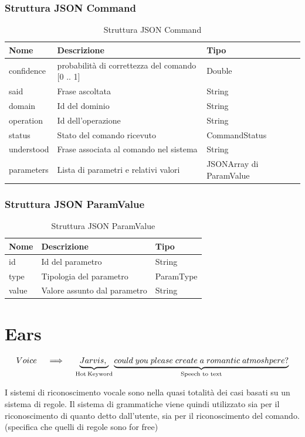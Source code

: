 \documentclass[twoside]{supsistudent}
\begin{document}
\subsection{Struttura JSON Command}
\begin{table}[H]
\centering
\caption{Struttura JSON Command}
\label{Struttura JSON Command}
\begin{tabular}{|l|l|l|}
\hline
Nome            & Descrizione                            & Tipo                        \\ \hline
confidence          & probabilità di correttezza del comando   [0 .. 1]                  & Double                      \\ \hline
said            & Frase ascoltata                        & String                      \\ \hline
domain          & Id del dominio                         & String                      \\ \hline
operation       & Id dell'operazione                     & String                      \\ \hline
status       & Stato del comando ricevuto                    & CommandStatus                      \\ \hline
understood      & Frase associata al comando nel sistema & String                      \\ \hline
parameters & Lista di parametri e relativi valori   & JSONArray di ParamValue \\ \hline
\end{tabular}
\end{table}
\subsection{Struttura JSON ParamValue}
\begin{table}[H]
\centering
\caption{Struttura JSON ParamValue}
\label{Struttura JSON ParamValue}
\begin{tabular}{|l|l|l|}
\hline
Nome  & Descrizione                  & Tipo      \\ \hline
id    & Id del parametro             & String    \\ \hline
type  & Tipologia del parametro      & ParamType \\ \hline
value & Valore assunto dal parametro & String    \\ \hline
\end{tabular}
\end{table}

\chapter{Ears}
\begin{center}
\[
 Voice \quad\implies\quad
\underbrace{Jarvis,\;}_\text{Hot\:Keyword}
\underbrace{could\;you\;please\;create\;a\;romantic\;atmoshpere?}_\text{Speech to text}
\]
\end{center}
I sistemi di riconoscimento vocale sono nella quasi totalità dei casi basati su un sistema di regole. Il sistema di grammatiche viene quindi utilizzato sia per il riconoscimento di quanto detto dall'utente, sia per il riconoscimento del comando. (specifica che quelli di regole sono for free)
\end{document}
